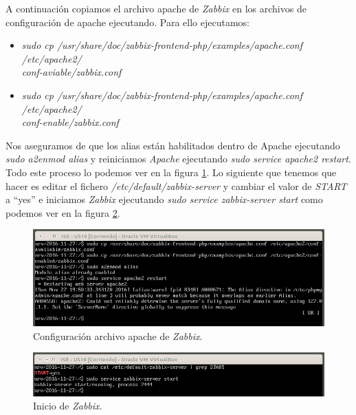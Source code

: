\documentclass[a4paper,titlepage,12pt]{report}	%
\numberwithin{figure}{section} %
\numberwithin{table}{section} %
\begin{document}
	A continuación copiamos el archivo apache de \textit{Zabbix} en los archivos de configuración de apache ejecutando. Para ello ejecutamos:
	\begin{itemize}
	   \item \textit{sudo cp /usr/share/doc/zabbix-frontend-php/examples/apache.conf /etc/apache2/\\conf-aviable/zabbix.conf}
	   \item \textit{sudo cp /usr/share/doc/zabbix-frontend-php/examples/apache.conf /etc/apache2/\\conf-enable/zabbix.conf}
	\end{itemize}

	Nos aseguramos de que los alias están habilitados dentro de Apache ejecutando \textit{sudo a2enmod alias} y reiniciamos \textit{Apache} ejecutando \textit{sudo service apache2 restart}. Todo este proceso lo podemos ver en la figura \ref{P3-O4-9}. Lo siguiente que tenemos que hacer es editar el fichero \textit{/etc/default/zabbix-server} y cambiar el valor de \textit{START} a ``yes'' e iniciamos \textit{Zabbix} ejecutando \textit{sudo service zabbix-server start} como podemos ver en la figura \ref{P3-O4-10}.

	\begin{figure}[H]
	   \includegraphics[width=\linewidth]{./Imagenes/P3/O4-9.png}
	   \vspace{-0.5cm}
	   \caption[Configuración archivo apache de \textit{Zabbix}.]{Configuración archivo apache de \textit{Zabbix}.}
	   \label{P3-O4-9}
	\end{figure}

	\begin{figure}[H]
	   \includegraphics[width=\linewidth]{./Imagenes/P3/O4-10.png}
	   \vspace{-0.5cm}
	   \caption[Inicio de \textit{Zabbix}.]{Inicio de \textit{Zabbix}.}
	   \label{P3-O4-10}
	\end{figure}
\end{document}
